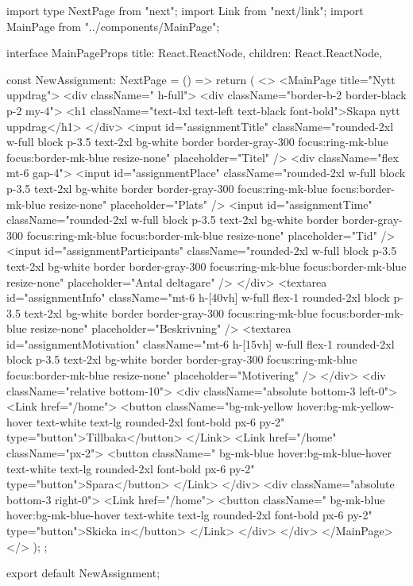 import type { NextPage } from "next";
import Link from "next/link";
import MainPage from "../components/MainPage";

interface MainPageProps {
    title: React.ReactNode,
    children: React.ReactNode,
}

const NewAssignment: NextPage = () => {
    return (
        <>
            <MainPage title={"Nytt uppdrag"}>
                <div className="  h-full">
                    <div className="border-b-2 border-black p-2 my-4">
                        <h1 className="text-4xl text-left text-black font-bold">Skapa nytt uppdrag</h1>
                    </div>
                    <input id="assignmentTitle" className="rounded-2xl w-full block p-3.5 text-2xl bg-white border border-gray-300 focus:ring-mk-blue focus:border-mk-blue resize-none" placeholder="Titel" />
                    <div className="flex mt-6 gap-4">
                        <input id="assignmentPlace" className="rounded-2xl w-full block p-3.5 text-2xl bg-white border border-gray-300 focus:ring-mk-blue focus:border-mk-blue resize-none" placeholder="Plats" />
                        <input id="assignmentTime" className="rounded-2xl w-full block p-3.5 text-2xl bg-white border border-gray-300 focus:ring-mk-blue focus:border-mk-blue resize-none" placeholder="Tid" />
                        <input id="assignmentParticipants" className="rounded-2xl w-full block p-3.5 text-2xl bg-white border border-gray-300 focus:ring-mk-blue focus:border-mk-blue resize-none" placeholder="Antal deltagare" />
                    </div>
                    <textarea id="assignmentInfo" className="mt-6 h-[40vh] w-full flex-1 rounded-2xl block p-3.5 text-2xl bg-white border border-gray-300 focus:ring-mk-blue focus:border-mk-blue resize-none" placeholder="Beskrivning" />
                    <textarea id="assignmentMotivation" className="mt-6 h-[15vh] w-full flex-1 rounded-2xl block p-3.5 text-2xl bg-white border border-gray-300 focus:ring-mk-blue focus:border-mk-blue resize-none" placeholder="Motivering" />
                </div>
                <div className="relative bottom-10">
                    <div className="absolute bottom-3 left-0">
                        <Link href="/home">
                            <button className="bg-mk-yellow hover:bg-mk-yellow-hover text-white text-lg rounded-2xl font-bold px-6 py-2" type="button">Tillbaka</button>
                        </Link>
                        <Link href="/home" className="px-2">
                            <button className="  bg-mk-blue hover:bg-mk-blue-hover text-white text-lg rounded-2xl font-bold px-6 py-2" type="button">Spara</button>
                        </Link>
                    </div>
                    <div className="absolute bottom-3 right-0">
                        <Link href="/home">
                            <button className="  bg-mk-blue hover:bg-mk-blue-hover text-white text-lg rounded-2xl font-bold px-6 py-2" type="button">Skicka in</button>
                        </Link>
                    </div>
                </div>
            </MainPage>
        </>
    );
};

export default NewAssignment;
